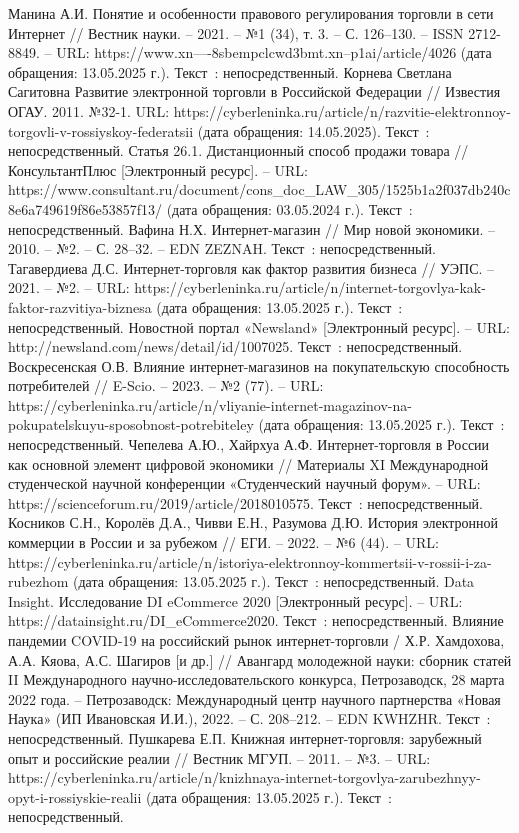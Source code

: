 
\begin{thebibliography}{9}

     Манина А.И. Понятие и особенности правового регулирования торговли в сети Интернет // Вестник науки. – 2021. – №1 (34), т. 3. – С. 126–130. – ISSN 2712-8849. – URL: https://www.xn----8sbempclcwd3bmt.xn--p1ai/article/4026 (дата обращения: 13.05.2025 г.). Текст~: непосредственный.
     Корнева Светлана Сагитовна Развитие электронной торговли в Российской Федерации // Известия ОГАУ. 2011. №32-1. URL: https://cyberleninka.ru/article/n/razvitie-elektronnoy-torgovli-v-rossiyskoy-federatsii (дата обращения: 14.05.2025). Текст~: непосредственный.
     Статья 26.1. Дистанционный способ продажи товара // КонсультантПлюс [Электронный ресурс]. – URL: https://www.consultant.ru/document/cons\_doc\_LAW\_305/1525b1a2f037db240c8e6a749619f86e53857f13/ (дата обращения: 03.05.2024 г.). Текст~: непосредственный.
     Вафина Н.Х. Интернет-магазин // Мир новой экономики. – 2010. – №2. – С. 28–32. – EDN ZEZNAH. Текст~: непосредственный.
	 Тагавердиева Д.С. Интернет-торговля как фактор развития бизнеса // УЭПС. – 2021. – №2. – URL: https://cyberleninka.ru/article/n/internet-torgovlya-kak-faktor-razvitiya-biznesa (дата обращения: 13.05.2025 г.). Текст~: непосредственный.
	 Новостной портал «Newsland» [Электронный ресурс]. – URL: http://newsland.com/news/detail/id/1007025. Текст~: непосредственный.
	 Воскресенская О.В. Влияние интернет-магазинов на покупательскую способность потребителей // E-Scio. – 2023. – №2 (77). – URL: https://cyberleninka.ru/article/n/vliyanie-internet-magazinov-na-pokupatelskuyu-sposobnost-potrebiteley (дата обращения: 13.05.2025 г.). Текст~: непосредственный.
	 Чепелева А.Ю., Хайрхуа А.Ф. Интернет-торговля в России как основной элемент цифровой экономики // Материалы XI Международной студенческой научной конференции «Студенческий научный форум». – URL: https://scienceforum.ru/2019/article/2018010575. Текст~: непосредственный.
	 Косников С.Н., Королёв Д.А., Чивви Е.Н., Разумова Д.Ю. История электронной коммерции в России и за рубежом // ЕГИ. – 2022. – №6 (44). – URL: https://cyberleninka.ru/article/n/istoriya-elektronnoy-kommertsii-v-rossii-i-za-rubezhom (дата обращения: 13.05.2025 г.). Текст~: непосредственный.
	 Data Insight. Исследование DI eCommerce 2020 [Электронный ресурс]. – URL: https://datainsight.ru/DI\_eCommerce2020. Текст~: непосредственный.
	 Влияние пандемии COVID-19 на российский рынок интернет-торговли / Х.Р. Хамдохова, А.А. Кяова, А.С. Шагиров [и др.] // Авангард молодежной науки: сборник статей II Международного научно-исследовательского конкурса, Петрозаводск, 28 марта 2022 года. – Петрозаводск: Международный центр научного партнерства «Новая Наука» (ИП Ивановская И.И.), 2022. – С. 208–212. – EDN KWHZHR. Текст~: непосредственный.
	 Пушкарева Е.П. Книжная интернет-торговля: зарубежный опыт и российские реалии // Вестник МГУП. – 2011. – №3. – URL: https://cyberleninka.ru/article/n/knizhnaya-internet-torgovlya-zarubezhnyy-opyt-i-rossiyskie-realii (дата обращения: 13.05.2025 г.).  Текст~: непосредственный.
   
	
\end{thebibliography}
